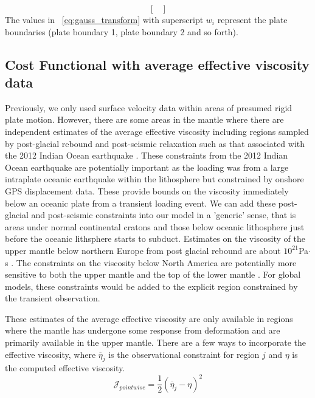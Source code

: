 \documentclass[12pt]{article}
\begin{document}
{\begin{equation}
\begin{bmatrix}
\end{bmatrix}
\label{eq:gauss_transform}
\end{equation}
The values in ~\eqref{eq:gauss_transform} with superscript $w_i$ represent the  plate boundaries (plate boundary 1, plate boundary 2 and so forth).

\subsection*{Cost Functional with average effective viscosity data}

Previously, we \citep{ratnaswamy2015adjoint} only used surface velocity data within areas of presumed rigid plate motion. 
However, there are some areas in the mantle where there are independent estimates of the average effective viscosity including regions sampled by post-glacial rebound and post-seismic relaxation such as that associated with the 2012 Indian Ocean earthquake \citep{hu2016asthenosphere}.  
These constraints from the 2012 Indian Ocean earthquake are potentially important as the loading was from a large intraplate oceanic earthquake within the lithosphere but constrained by onshore GPS displacement data. These provide bounds on the viscosity immediately below an oceanic plate from a transient loading event. We can add these post-glacial and post-seismic constraints into our model in a 'generic' sense, that is areas under normal continental cratons and those below oceanic lithosphere just before the oceanic lithsphere starts to subduct. Estimates on the viscosity of the upper mantle below northern Europe from post glacial rebound are about $10^{21}$Pa$\cdot$s \citep{hu2016asthenosphere}. The constraints on the viscosity below North America are potentially more sensitive to both the upper mantle and the top of the lower mantle \citep{mitrovica1995constraints,simons1997localization}. For global models, these constraints would be added to the explicit region constrained by the transient observation.

These estimates of the average effective viscosity are only available in regions where the mantle has undergone some response from deformation and are primarily available in the upper mantle.   There are a few ways to incorporate the effective viscosity, where $\overline{\eta}_j$ is the observational constraint for region $j$ and $\eta$ is the computed effective viscosity. 
\begin{equation}
   \mathcal{J}_{pointwise}=  \frac{1}{2}(\overline{\eta}_j - \eta)^{2}
\label{eq:pointwise}
\end{equation}

}
\end{document}

